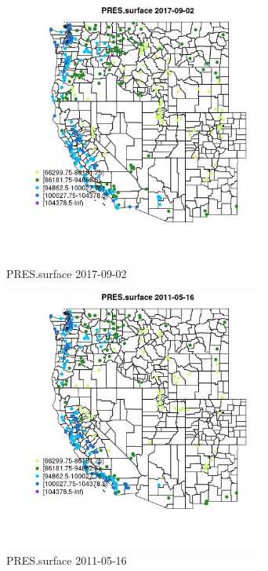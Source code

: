 \begin{figure} 
\centering  
\includegraphics[width=0.77\textwidth]{Code_Outputs/Report_ML_input_PM25_Step4_part_e_de_duplicated_aves_compiled_2019-05-20wNAs_MapObsPRESsurface2017-09-02.jpg} 
\caption{\label{fig:Report_ML_input_PM25_Step4_part_e_de_duplicated_aves_compiled_2019-05-20wNAsMapObsPRESsurface2017-09-02}PRES.surface 2017-09-02} 
\end{figure} 
 

\begin{figure} 
\centering  
\includegraphics[width=0.77\textwidth]{Code_Outputs/Report_ML_input_PM25_Step4_part_e_de_duplicated_aves_compiled_2019-05-20wNAs_MapObsPRESsurface2011-05-16.jpg} 
\caption{\label{fig:Report_ML_input_PM25_Step4_part_e_de_duplicated_aves_compiled_2019-05-20wNAsMapObsPRESsurface2011-05-16}PRES.surface 2011-05-16} 
\end{figure} 
 

